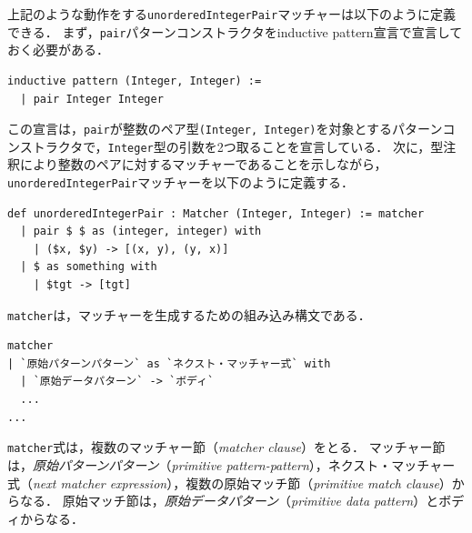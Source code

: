上記のような動作をする\lstinline{unorderedIntegerPair}マッチャーは以下のように定義できる．
まず，\lstinline{pair}パターンコンストラクタをinductive pattern宣言で宣言しておく必要がある．
\begin{lstlisting}[language=egison]
inductive pattern (Integer, Integer) :=
  | pair Integer Integer
\end{lstlisting}
この宣言は，\lstinline{pair}が整数のペア型\lstinline{(Integer, Integer)}を対象とするパターンコンストラクタで，\lstinline{Integer}型の引数を2つ取ることを宣言している．
次に，型注釈により整数のペアに対するマッチャーであることを示しながら，\lstinline{unorderedIntegerPair}マッチャーを以下のように定義する．
\begin{lstlisting}[language=egison]
def unorderedIntegerPair : Matcher (Integer, Integer) := matcher
  | pair $ $ as (integer, integer) with
    | ($x, $y) -> [(x, y), (y, x)]
  | $ as something with
    | $tgt -> [tgt]
\end{lstlisting}
\lstinline{matcher}は，マッチャーを生成するための組み込み構文である．
\begin{lstlisting}[language=egison,numbers=none]
matcher
| `原始パターンパターン` as `ネクスト・マッチャー式` with
  | `原始データパターン` -> `ボディ`
  ...
...
\end{lstlisting}
\lstinline{matcher}式は，複数のマッチャー節（\emph{matcher clause}）をとる．
マッチャー節は，\emph{原始パターンパターン}（\emph{primitive pattern-pattern}），ネクスト・マッチャー式（\emph{next matcher expression}），複数の原始マッチ節（\emph{primitive match clause}）からなる．
原始マッチ節は，\emph{原始データパターン}（\emph{primitive data pattern}）とボディからなる．


